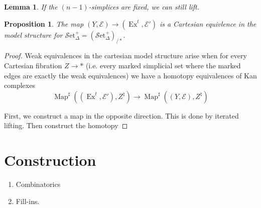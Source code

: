 \documentclass[english]{amsart}
\newcommand{\map}{\operatorname{Map}}
\newcommand{\mc}{\mathcal}
\newcommand{\sset}{\mc{S}\text{et}_\Delta}
\newtheorem*{lem}{Lemma}
\newtheorem*{prop}{Proposition}
\theoremstyle{definition}
\begin{document}
\begin{lem}
If the $(n-1)$-simplices are fixed, we can still lift. 
\end{lem}


\begin{prop}
The map $(Y,\mc{E}) \to (\operatorname{Ex}^t, \mc{E}')$ is a Cartesian equivlence in the model structure for $\sset^+ = (\sset^+)_{/\ast}$. 
\end{prop}
\begin{proof}
Weak equivalences in the cartesian model structure arise when for every Cartesian fibration $Z \to \ast$ (i.e. every marked simplicial set where the marked edges are exactly the weak equivalences) we have a homotopy equivalences of Kan complexes
\[
\map^\sharp((\operatorname{Ex}^t, \mc{E}'), Z^\natural) \to \map^\sharp ((Y,\mc{E}), Z^\natural)
\]

First, we construct a map in the opposite direction. This is done by iterated lifting. Then construct the homotopy 
\end{proof}

\section{Construction}

\begin{enumerate}
\item Combinatorics

\item Fill-ins. 
\end{enumerate}
\end{document}
